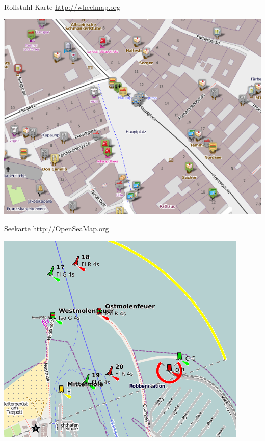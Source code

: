 \documentclass{beamer}
\begin{document}
\begin{frame}{Rollstuhl-Karte}
\url{http://wheelmap.org}

\begin{center}
\includegraphics[width=.6\paperwidth]{wheelmap.png}
\end{center}
\end{frame}

\begin{frame}{Seekarte}
\url{http://OpenSeaMap.org}

\begin{center}
\includegraphics[width=.55\paperwidth]{seamap.png}
\end{center}
\end{frame}
\end{document}
